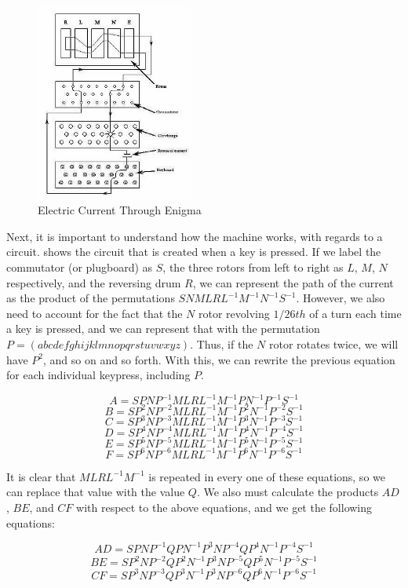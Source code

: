 \begin{figure}[h!]
\begin{centering}
  \includegraphics[height=6.5cm]{images/permutations.jpg}
  \caption{Electric Current Through Enigma}
  \label{fig:current1}
\end{centering}
\end{figure}

Next, it is important to understand how the machine works, with regards to a circuit.  shows the circuit that is created when a key is pressed. If we label the commutator (or plugboard) as $S$, the three rotors from left to right as $L$, $M$, $N$ respectively, and the reversing drum $R$, we can represent the path of the current as the product of the permutations $SNMLRL^{-1}M^{-1}N^{-1}S^{-1}$. However, we also need to account for the fact that the $N$ rotor revolving $1/26th$ of a turn each time a key is pressed, and we can represent that with the permutation $P = (abcdefghijklmnopqrstuvwxyz)$. Thus, if the $N$ rotor rotates twice, we will have $P^2$, and so on and so forth. With this, we can rewrite the previous equation for each individual keypress, including $P$.

$$A = SPNP^{-1}MLRL^{-1}M^{-1}PN^{-1}P^{-1}S^{-1}$$
$$B = SP^2NP^{-2}MLRL^{-1}M^{-1}P^2N^{-1}P^{-2}S^{-1}$$
$$C = SP^3NP^{-3}MLRL^{-1}M^{-1}P^3N^{-1}P^{-3}S^{-1}$$
$$D = SP^4NP^{-4}MLRL^{-1}M^{-1}P^4N^{-1}P^{-4}S^{-1}$$
$$E = SP^5NP^{-5}MLRL^{-1}M^{-1}P^5N^{-1}P^{-5}S^{-1}$$
$$F = SP^6NP^{-6}MLRL^{-1}M^{-1}P^6N^{-1}P^{-6}S^{-1}$$

It is clear that $MLRL^{-1}M^{-1}$ is repeated in every one of these equations, so we can replace that value with the value $Q$. \cite{wk85} We also must calculate the products $AD$, $BE$, and $CF$ with respect to the above equations, and we get the following equations:

$$AD = SPNP^{-1}QPN^{-1}P^3NP^{-4}QP^4N^{-1}P^{-4}S^{-1}$$
$$BE = SP^2NP^{-2}QP^2N^{-1}P^3NP^{-5}QP^5N^{-1}P^{-5}S^{-1}$$
$$CF = SP^3NP^{-3}QP^3N^{-1}P^3NP^{-6}QP^6N^{-1}P^{-6}S^{-1}$$

